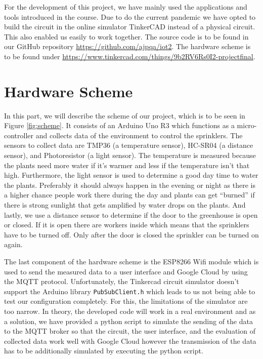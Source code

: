 \documentclass{article}
\begin{document}
For the development of this project, we have mainly used the applications and tools introduced in the course. Due to do the current pandemic we have opted to build the circuit in the online simulator TinkerCAD instead of a physical circuit. This also enabled us easily to work together. The source code is to be found in our GitHub repository \url{https://github.com/ajpqa/iot2}. The hardware scheme is to be found under \url{https://www.tinkercad.com/things/9b2RV6Rs0I2-projectfinal}.

\section{Hardware Scheme}
In this part, we will describe the scheme of our project, which is to be seen in Figure \ref{fig:scheme}. It consists of an Arduino Uno R3 which functions as a micro-controller and collects data of the environment to control the sprinklers. The sensors to collect data are TMP36 (a temperature sensor), HC-SR04 (a distance sensor), and Photoresistor (a light sensor). The temperature is measured because the plants need more water if it's warmer and less if the temperature isn't that high. Furthermore, the light sensor is used to determine a good day time to water the plants. Preferably it should always happen in the evening or night as there is a higher chance people work there during the day and plants can get \enquote{burned} if there is strong sunlight that gets amplified by water drops on the plants. And lastly, we use a distance sensor to determine if the door to the greenhouse is open or closed. If it is open there are workers inside which means that the sprinklers have to be turned off. Only after the door is closed the sprinkler can be turned on again.\par
The last component of the hardware scheme is the ESP8266 Wifi module which is used to send the measured data to a user interface and Google Cloud by using the MQTT protocol. Unfortunately, the Tinkercad circuit simulator doesn't support the Arduino library \texttt{PubSubClient.h} which leads to us not being able to test our configuration completely. For this, the limitations of the simulator are too narrow. In theory, the developed code will work in a real environment and as a solution, we have provided a python script to simulate the sending of the data to the MQTT broker so that the circuit, the user interface, and the evaluation of collected data work well with Google Cloud however the transmission of the data has to be additionally simulated by executing the python script.
\end{document}
